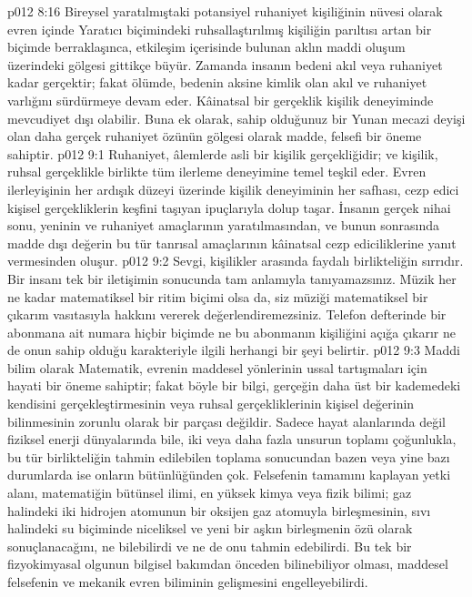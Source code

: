 \vs p012 8:16 Bireysel yaratılmıştaki potansiyel ruhaniyet kişiliğinin nüvesi olarak evren içinde Yaratıcı biçimindeki ruhsallaştırılmış kişiliğin parıltısı artan bir biçimde berraklaşınca, etkileşim içerisinde bulunan aklın maddi oluşum üzerindeki gölgesi gittikçe büyür. Zamanda insanın bedeni akıl veya ruhaniyet kadar gerçektir; fakat ölümde, bedenin aksine kimlik olan akıl ve ruhaniyet varlığını sürdürmeye devam eder. Kâinatsal bir gerçeklik kişilik deneyiminde mevcudiyet dışı olabilir. Buna ek olarak, sahip olduğunuz bir Yunan mecazi deyişi olan daha gerçek ruhaniyet özünün gölgesi olarak madde, felsefi bir öneme sahiptir.
\vs p012 9:1 Ruhaniyet, âlemlerde asli bir kişilik gerçekliğidir; ve kişilik, ruhsal gerçeklikle birlikte tüm ilerleme deneyimine temel teşkil eder. Evren ilerleyişinin her ardışık düzeyi üzerinde kişilik deneyiminin her safhası, cezp edici kişisel gerçekliklerin keşfini taşıyan ipuçlarıyla dolup taşar. İnsanın gerçek nihai sonu, yeninin ve ruhaniyet amaçlarının yaratılmasından, ve bunun sonrasında madde dışı değerin bu tür tanrısal amaçlarının kâinatsal cezp ediciliklerine yanıt vermesinden oluşur.
\vs p012 9:2 Sevgi, kişilikler arasında faydalı birlikteliğin sırrıdır. Bir insanı tek bir iletişimin sonucunda tam anlamıyla tanıyamazsınız. Müzik her ne kadar matematiksel bir ritim biçimi olsa da, siz müziği matematiksel bir çıkarım vasıtasıyla hakkını vererek değerlendiremezsiniz. Telefon defterinde bir abonmana ait numara hiçbir biçimde ne bu abonmanın kişiliğini açığa çıkarır ne de onun sahip olduğu karakteriyle ilgili herhangi bir şeyi belirtir.
\vs p012 9:3 Maddi bilim olarak Matematik, evrenin maddesel yönlerinin ussal tartışmaları için hayati bir öneme sahiptir; fakat böyle bir bilgi, gerçeğin daha üst bir kademedeki kendisini gerçekleştirmesinin veya ruhsal gerçekliklerinin kişisel değerinin bilinmesinin zorunlu olarak bir parçası değildir. Sadece hayat alanlarında değil fiziksel enerji dünyalarında bile, iki veya daha fazla unsurun toplamı çoğunlukla, bu tür birlikteliğin tahmin edilebilen toplama sonucundan bazen  veya yine bazı durumlarda ise onların bütünlüğünden çok. Felsefenin tamamını kaplayan yetki alanı, matematiğin bütünsel ilimi, en yüksek kimya veya fizik bilimi; gaz halindeki iki hidrojen atomunun bir oksijen gaz atomuyla birleşmesinin, sıvı halindeki su biçiminde niceliksel ve yeni bir aşkın birleşmenin özü olarak sonuçlanacağını, ne bilebilirdi ve ne de onu tahmin edebilirdi. Bu tek bir fizyokimyasal olgunun bilgisel bakımdan önceden bilinebiliyor olması, maddesel felsefenin ve mekanik evren biliminin gelişmesini engelleyebilirdi.
